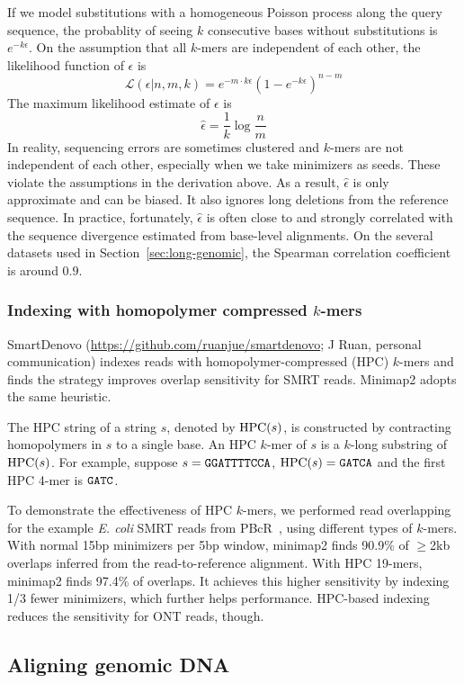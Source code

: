 \documentclass{bioinfo}
\begin{document}
\begin{methods}
If we model substitutions with a homogeneous Poisson process along the query
sequence, the probablity of seeing $k$ consecutive bases without substitutions
is $e^{-k\epsilon}$. On the assumption that all $k$-mers are independent of
each other, the likelihood function of $\epsilon$ is
\[
\mathcal{L}(\epsilon|n,m,k)=e^{-m\cdot k\epsilon}(1-e^{-k\epsilon})^{n-m}
\]
The maximum likelihood estimate of $\epsilon$ is
\[
\hat{\epsilon}=\frac{1}{k}\log\frac{n}{m}
\]
In reality, sequencing errors are sometimes clustered and $k$-mers are not
independent of each other, especially when we take minimizers as seeds. These
violate the assumptions in the derivation above. As a result, $\hat{\epsilon}$
is only approximate and can be biased. It also ignores long deletions from the
reference sequence. In practice, fortunately, $\hat{\epsilon}$ is often close
to and strongly correlated with the sequence divergence estimated from
base-level alignments. On the several datasets used in
Section~\ref{sec:long-genomic}, the Spearman correlation coefficient is around
$0.9$.

\subsubsection{Indexing with homopolymer compressed $k$-mers}
SmartDenovo
(\href{https://github.com/ruanjue/smartdenovo}{https://github.com/ruanjue/smartdenovo};
J Ruan, personal communication) indexes reads with homopolymer-compressed (HPC)
$k$-mers and finds the strategy improves overlap sensitivity for SMRT reads.
Minimap2 adopts the same heuristic.

The HPC string of a string $s$, denoted by ${\rm HPC}(s)$, is constructed by
contracting homopolymers in $s$ to a single base.  An HPC $k$-mer of $s$ is a
$k$-long substring of ${\rm HPC}(s)$. For example, suppose $s={\tt GGATTTTCCA}$,
${\rm HPC}(s)={\tt GATCA}$ and the first HPC 4-mer is ${\tt GATC}$.

To demonstrate the effectiveness of HPC $k$-mers, we performed read overlapping
for the example {\it E. coli} SMRT reads from PBcR~\citep{Berlin:2015xy}, using
different types of $k$-mers. With normal 15bp minimizers per 5bp window,
minimap2 finds 90.9\% of $\ge$2kb overlaps inferred from the read-to-reference
alignment. With HPC 19-mers, minimap2 finds 97.4\% of overlaps. It achieves this
higher sensitivity by indexing 1/3 fewer minimizers, which further helps
performance. HPC-based indexing reduces the sensitivity for ONT reads, though.

\subsection{Aligning genomic DNA}\label{sec:genomic}


\end{methods}
\end{document}
